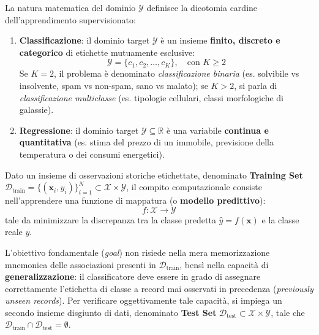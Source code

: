 La natura matematica del dominio $\mathcal{Y}$ definisce la dicotomia cardine dell'apprendimento supervisionato:
\begin{enumerate}
    \item \textbf{Classificazione}: il dominio target $\mathcal{Y}$ è un insieme \textbf{finito, discreto e categorico} di etichette mutuamente esclusive:
    \begin{equation}
        \mathcal{Y} = \{c_1, c_2, \dots, c_K\}, \quad \text{con } K \ge 2
    \end{equation}
    Se $K = 2$, il problema è denominato \textit{classificazione binaria} (es. solvibile vs insolvente, spam vs non-spam, sano vs malato); se $K > 2$, si parla di \textit{classificazione multiclasse} (es. tipologie cellulari, classi morfologiche di galassie).
    \item \textbf{Regressione}: il dominio target $\mathcal{Y} \subseteq \mathbb{R}$ è una variabile \textbf{continua e quantitativa} (es. stima del prezzo di un immobile, previsione della temperatura o dei consumi energetici).
\end{enumerate}

\begin{definition}
Dato un insieme di osservazioni storiche etichettate, denominato \textbf{Training Set} $\mathcal{D}_{\text{train}} = \{(\mathbf{x}_i, y_i)\}_{i=1}^N \subset \mathcal{X} \times \mathcal{Y}$, il compito computazionale consiste nell'apprendere una funzione di mappatura (o \textbf{modello predittivo}):
\begin{equation}
    f: \mathcal{X} \longrightarrow \mathcal{Y}
\end{equation}
tale da minimizzare la discrepanza tra la classe predetta $\hat{y} = f(\mathbf{x})$ e la classe reale $y$.
\end{definition}

L'obiettivo fondamentale (\textit{goal}) non risiede nella mera memorizzazione mnemonica delle associazioni presenti in $\mathcal{D}_{\text{train}}$, bensì nella capacità di \textbf{generalizzazione}: il classificatore deve essere in grado di assegnare correttamente l'etichetta di classe a record mai osservati in precedenza (\textit{previously unseen records}). Per verificare oggettivamente tale capacità, si impiega un secondo insieme disgiunto di dati, denominato \textbf{Test Set} $\mathcal{D}_{\text{test}} \subset \mathcal{X} \times \mathcal{Y}$, tale che $\mathcal{D}_{\text{train}} \cap \mathcal{D}_{\text{test}} = \emptyset$.

